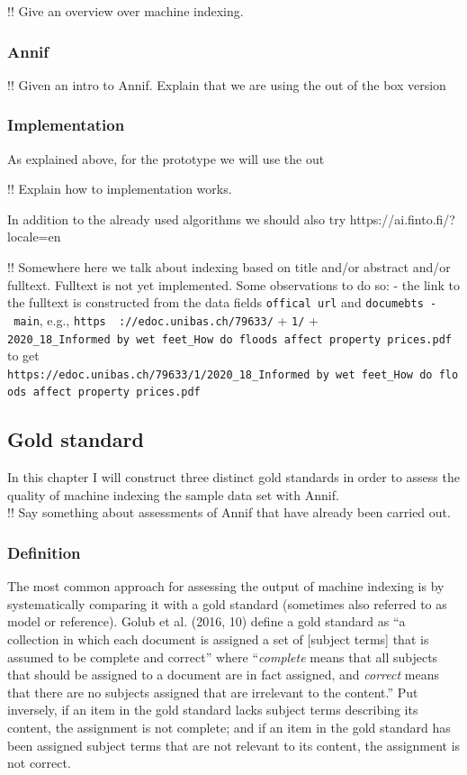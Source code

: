 !! Give an overview over machine indexing.

\hypertarget{annif}{%
\subsubsection{Annif}\label{annif}}

!! Given an intro to Annif. Explain that we are using the out of the box
version

\hypertarget{implementation}{%
\subsubsection{Implementation}\label{implementation}}

As explained above, for the prototype we will use the out

!! Explain how to implementation works.

In addition to the already used algorithms we should also try
https://ai.finto.fi/?locale=en

!! Somewhere here we talk about indexing based on title and/or abstract
and/or fulltext. Fulltext is not yet implemented. Some observations to
do so: - the link to the fulltext is constructed from the data fields
\texttt{offical\ url} and \texttt{documebts\ -\ main}, e.g.,
\texttt{https\ \ ://edoc.unibas.ch/79633/} + \texttt{1/} +
\texttt{2020\_18\_Informed\ by\ wet\ feet\_How\ do\ floods\ affect\ property\ prices.pdf}
to get
\texttt{https://edoc.unibas.ch/79633/1/2020\_18\_Informed\ by\ wet\ feet\_How\ do\ floods\ affect\ property\ prices.pdf}

\hypertarget{gold-standard}{%
\subsection{Gold standard}\label{gold-standard}}

In this chapter I will construct three distinct gold standards in order
to assess the quality of machine indexing the sample data set with
Annif.\\
!! Say something about assessments of Annif that have already been
carried out.

\hypertarget{definition}{%
\subsubsection{Definition}\label{definition}}

The most common approach for assessing the output of machine indexing is
by systematically comparing it with a gold standard (sometimes also
referred to as model or reference). Golub et al. (2016, 10) define a
gold standard as ``a collection in which each document is assigned a set
of {[}subject terms{]} that is assumed to be complete and correct''
where ``\emph{complete} means that all subjects that should be assigned
to a document are in fact assigned, and \emph{correct} means that there
are no subjects assigned that are irrelevant to the content.'' Put
inversely, if an item in the gold standard lacks subject terms
describing its content, the assignment is not complete; and if an item
in the gold standard has been assigned subject terms that are not
relevant to its content, the assignment is not correct.

